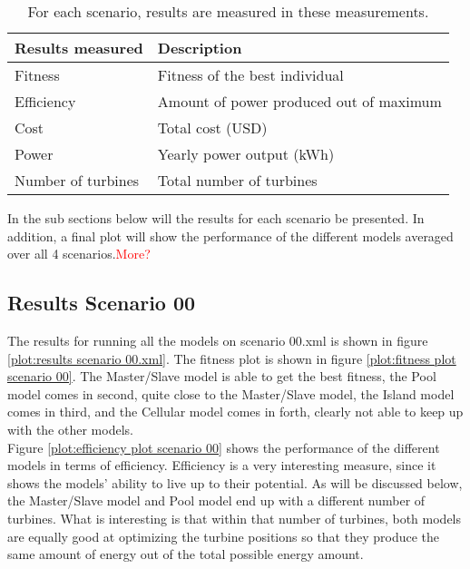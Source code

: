 \begin{table}[h!]
\centering
\caption{For each scenario, results are measured in these measurements.}
\label{table:overview}
\centering
\begin{tabular}{l|l}
\textbf{Results measured}   & \textbf{Description} \\
\hline
Fitness                     & Fitness of the best individual \\
Efficiency                  & Amount of power produced out of maximum \\
Cost                        & Total cost (USD)\\
Power                       & Yearly power output (kWh) \\
Number of turbines          & Total number of turbines
\end{tabular}
\end{table}


\noindent In the sub sections below will the results for each scenario be presented. In addition, a final plot will show the performance of the different models averaged over all 4 scenarios.\textcolor{red}{More?}\\


\subsection{Results Scenario 00}
The results for running all the models on scenario 00.xml is shown in figure \ref{plot:results scenario 00.xml}. The fitness plot is shown in figure \ref{plot:fitness plot scenario 00}. The Master/Slave model is able to get the best fitness, the Pool model comes in second, quite close to the Master/Slave model, the Island model comes in third, and the Cellular model comes in forth, clearly not able to keep up with the other models.\\ 


\noindent Figure \ref{plot:efficiency plot scenario 00} shows the performance of the different models in terms of efficiency. Efficiency is a very interesting measure, since it shows the models' ability to live up to their potential. As will be discussed below, the Master/Slave model and Pool model end up with a different number of turbines. What is interesting is that within that number of turbines, both models are equally good at optimizing the turbine positions so that they produce the same amount of energy out of the total possible energy amount.\\


